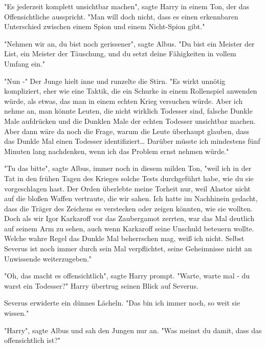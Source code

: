 {"Es jederzeit komplett unsichtbar machen", sagte Harry in einem Ton, der das Offensichtliche ausspricht. "Man will doch nicht, dass es einen erkennbaren Unterschied zwischen einem Spion und einem Nicht-Spion gibt."

"Nehmen wir an, du bist noch gerissener", sagte Albus. "Du bist ein Meister der List, ein Meister der Täuschung, und du setzt deine Fähigkeiten in vollem Umfang ein."

"Nun -" Der Junge hielt inne und runzelte die Stirn. "Es wirkt unnötig kompliziert, eher wie eine Taktik, die ein Schurke in einem Rollenspiel anwenden würde, als etwas, das man in einem echten Krieg versuchen würde. Aber ich nehme an, man könnte Leuten, die nicht wirklich Todesser sind, falsche Dunkle Male aufdrücken und die Dunklen Male der echten Todesser unsichtbar machen. Aber dann wäre da noch die Frage, warum die Leute überhaupt glauben, dass das Dunkle Mal einen Todesser identifiziert… Darüber müsste ich mindestens fünf Minuten lang nachdenken, wenn ich das Problem ernst nehmen würde."

"Tu das bitte", sagte Albus, immer noch in diesem milden Ton, "weil ich in der Tat in den frühen Tagen des Krieges solche Tests durchgeführt habe, wie du sie vorgeschlagen hast. Der Orden überlebte meine Torheit nur, weil Alastor nicht auf die bloßen Waffen vertraute, die wir sahen. Ich hatte im Nachhinein gedacht, dass die Träger des Zeichens es verstecken oder zeigen könnten, wie sie wollten. Doch als wir Igor Karkaroff vor das Zaubergamot zerrten, war das Mal deutlich auf seinem Arm zu sehen, auch wenn Karkaroff seine Unschuld beteuern wollte. Welche wahre Regel das Dunkle Mal beherrschen mag, weiß ich nicht. Selbst Severus ist noch immer durch sein Mal verpflichtet, seine Geheimnisse nicht an Unwissende weiterzugeben."

"Oh, das macht es offensichtlich", sagte Harry prompt. "Warte, warte mal - du warst ein Todesser?" Harry übertrug seinen Blick auf Severus.

Severus erwiderte ein dünnes Lächeln. "Das bin ich immer noch, so weit sie wissen."

"Harry", sagte Albus und sah den Jungen nur an. "Was meinst du damit, dass das offensichtlich ist?"

}
